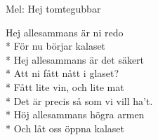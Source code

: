 \begin{SongText}
    \begin{SongInfo}
        Mel: Hej tomtegubbar
    \end{SongInfo}
    \begin{SongVerse}
        Hej allesammans är ni redo\\*%
        För nu börjar kalaset\\*%
        Hej allesammans är det säkert\\*%
        Att ni fått nått i glaset?\\*%
        Fått lite vin, och lite mat\\*%
        Det är precis så som vi vill ha’t.\\*%
        Höj allesammans högra armen\\*%
        Och låt oss öppna kalaset
    \end{SongVerse}
\end{SongText}

